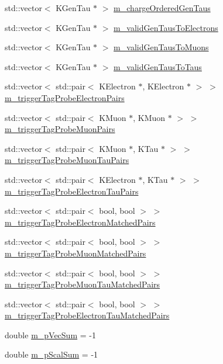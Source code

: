 \begin{DoxyCompactItemize}
\item 
std::vector$<$ KGenTau $\ast$ $>$ \hyperlink{classHttProduct_a7d32c5bc91b092a3a59af15a00ec6ec4}{m\_\-chargeOrderedGenTaus}
\item 
std::vector$<$ KGenTau $\ast$ $>$ \hyperlink{classHttProduct_a9b4abe266732576c4acebde25b49a9a0}{m\_\-validGenTausToElectrons}
\item 
std::vector$<$ KGenTau $\ast$ $>$ \hyperlink{classHttProduct_a0f0b0a177d96a0aaa051228061356033}{m\_\-validGenTausToMuons}
\item 
std::vector$<$ KGenTau $\ast$ $>$ \hyperlink{classHttProduct_abd8f9838618318dde76c1c98b6d00e0d}{m\_\-validGenTausToTaus}
\item 
std::vector$<$ std::pair$<$ KElectron $\ast$, KElectron $\ast$ $>$ $>$ \hyperlink{classHttProduct_a4593cae98fab3011e52bf798ff266e75}{m\_\-triggerTagProbeElectronPairs}
\item 
std::vector$<$ std::pair$<$ KMuon $\ast$, KMuon $\ast$ $>$ $>$ \hyperlink{classHttProduct_a2222d478d3a8d53ab57680b6da314bf9}{m\_\-triggerTagProbeMuonPairs}
\item 
std::vector$<$ std::pair$<$ KMuon $\ast$, KTau $\ast$ $>$ $>$ \hyperlink{classHttProduct_a7b64fed593836a716e0549e4e3e593aa}{m\_\-triggerTagProbeMuonTauPairs}
\item 
std::vector$<$ std::pair$<$ KElectron $\ast$, KTau $\ast$ $>$ $>$ \hyperlink{classHttProduct_af58c919d7ebff1dbf5a0b062f4e093ae}{m\_\-triggerTagProbeElectronTauPairs}
\item 
std::vector$<$ std::pair$<$ bool, bool $>$ $>$ \hyperlink{classHttProduct_a165cea4e5d0a8f8ef984c4ce4ffeb125}{m\_\-triggerTagProbeElectronMatchedPairs}
\item 
std::vector$<$ std::pair$<$ bool, bool $>$ $>$ \hyperlink{classHttProduct_a3eedf80335cc6f6b9162db2c4228b1ea}{m\_\-triggerTagProbeMuonMatchedPairs}
\item 
std::vector$<$ std::pair$<$ bool, bool $>$ $>$ \hyperlink{classHttProduct_a14ce939d448152c742021f043fc8922b}{m\_\-triggerTagProbeMuonTauMatchedPairs}
\item 
std::vector$<$ std::pair$<$ bool, bool $>$ $>$ \hyperlink{classHttProduct_acfac99f7abceb758f67853389752d1fb}{m\_\-triggerTagProbeElectronTauMatchedPairs}
\item 
double \hyperlink{classHttProduct_aff3f5f7a0d777506d01369813d160925}{m\_\-pVecSum} = -\/1
\item 
double \hyperlink{classHttProduct_a45abb293846b6666a1f790e5958b719d}{m\_\-pScalSum} = -\/1
\item 

\end{DoxyCompactItemize}
